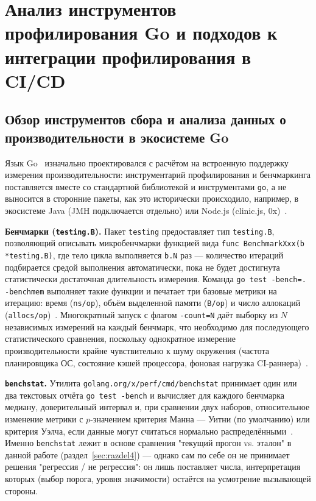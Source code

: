 \section{Анализ инструментов профилирования Go и подходов к интеграции профилирования в CI/CD}
\label{sec:razdel1}

\subsection{Обзор инструментов сбора и анализа данных о производительности в экосистеме Go}
\label{sec:1.1}

Язык Go~\cite{go-spec} изначально проектировался с расчётом на встроенную
поддержку измерения производительности: инструментарий профилирования и
бенчмаркинга поставляется вместе со стандартной библиотекой и
инструментами \texttt{go}, а не выносится в сторонние пакеты, как это
исторически происходило, например, в экосистеме Java (JMH подключается
отдельно) или Node.js (clinic.js, 0x)~\cite{donovan-kernighan}.

\textbf{Бенчмарки (\texttt{testing.B}).} Пакет \texttt{testing} предоставляет тип
\texttt{testing.B}, позволяющий описывать микробенчмарки функцией вида
\texttt{func BenchmarkXxx(b *testing.B)}, где тело цикла выполняется \texttt{b.N}
раз — количество итераций подбирается средой выполнения автоматически, пока не
будет достигнута статистически достаточная длительность измерения. Команда
\texttt{go test -bench=. -benchmem} выполняет такие функции и печатает три базовые
метрики на итерацию: время (\texttt{ns/\allowbreak op}), объём выделенной памяти
(\texttt{B/\allowbreak op}) и число аллокаций (\texttt{allocs/\allowbreak op})~\cite{go-testing-doc}.
Многократный запуск с флагом \texttt{-count=N} даёт выборку из $N$ независимых
измерений на каждый бенчмарк, что необходимо для последующего статистического
сравнения, поскольку однократное измерение производительности крайне
чувствительно к шуму окружения (частота планировщика ОС, состояние кэшей
процессора, фоновая нагрузка CI-раннера)~\cite{georges2007,mytkowicz2009}.

\textbf{\texttt{benchstat}.} Утилита \texttt{golang.org/\allowbreak x/\allowbreak perf/\allowbreak cmd/\allowbreak benchstat}
принимает один или два текстовых отчёта \texttt{go test -bench} и вычисляет
для каждого бенчмарка медиану, доверительный интервал и, при сравнении двух
наборов, относительное изменение метрики с $p$-значением критерия
Манна --- Уитни (по умолчанию) или критерия Уэлча, если данные могут считаться
нормально распределёнными~\cite{benchstat-doc,welch1947}. Именно
\texttt{benchstat} лежит в основе сравнения "текущий прогон vs. эталон" в
данной работе (раздел~\ref{sec:razdel4}) — однако сам по себе он не принимает
решения "регрессия / не регрессия": он лишь поставляет числа, интерпретация
которых (выбор порога, уровня значимости) остаётся на усмотрение вызывающей
стороны.

